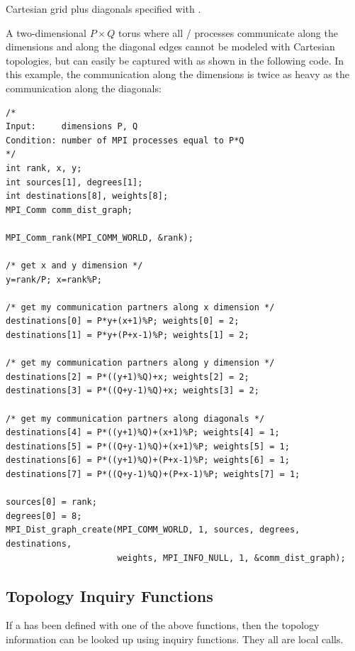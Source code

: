 \begin{example}
\label{topol-exH}
%
Cartesian grid plus diagonals specified with .

A two-dimensional $P \times Q$ torus where all \MPI/ processes communicate along the
dimensions and along the diagonal edges cannot be modeled with
Cartesian topologies, but can easily be captured with
 as shown in the following code. In this
example, the communication along the dimensions is twice as heavy as
the communication along the diagonals:

\begin{lstlisting}[language={[MPI]C}]
/*
Input:     dimensions P, Q
Condition: number of MPI processes equal to P*Q
*/
int rank, x, y;
int sources[1], degrees[1];
int destinations[8], weights[8];
MPI_Comm comm_dist_graph;

MPI_Comm_rank(MPI_COMM_WORLD, &rank);

/* get x and y dimension */
y=rank/P; x=rank%P;

/* get my communication partners along x dimension */
destinations[0] = P*y+(x+1)%P; weights[0] = 2;
destinations[1] = P*y+(P+x-1)%P; weights[1] = 2;

/* get my communication partners along y dimension */
destinations[2] = P*((y+1)%Q)+x; weights[2] = 2;
destinations[3] = P*((Q+y-1)%Q)+x; weights[3] = 2;

/* get my communication partners along diagonals */
destinations[4] = P*((y+1)%Q)+(x+1)%P; weights[4] = 1;
destinations[5] = P*((Q+y-1)%Q)+(x+1)%P; weights[5] = 1;
destinations[6] = P*((y+1)%Q)+(P+x-1)%P; weights[6] = 1;
destinations[7] = P*((Q+y-1)%Q)+(P+x-1)%P; weights[7] = 1;

sources[0] = rank;
degrees[0] = 8;
MPI_Dist_graph_create(MPI_COMM_WORLD, 1, sources, degrees, destinations,
                      weights, MPI_INFO_NULL, 1, &comm_dist_graph);
\end{lstlisting}
\end{example}

\subsection{Topology Inquiry Functions}
\label{subsec:topol-inquiry}

If a  has been defined with one of the above functions, then the topology
information can be looked up using inquiry functions. They all are local
calls.

